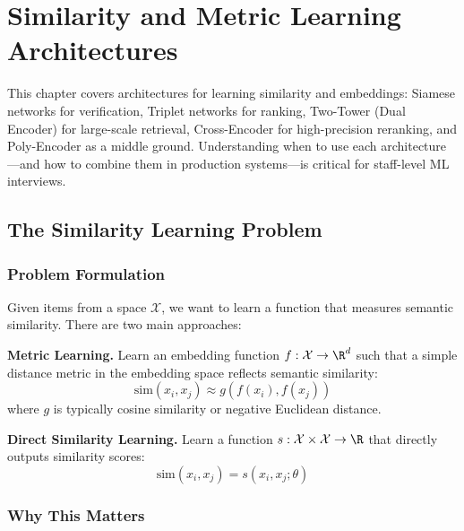 \chapter{Similarity and Metric Learning Architectures}
\label{chap:similarity_architectures}

\begin{tldr}
This chapter covers architectures for learning similarity and embeddings: Siamese networks for verification, Triplet networks for ranking, Two-Tower (Dual Encoder) for large-scale retrieval, Cross-Encoder for high-precision reranking, and Poly-Encoder as a middle ground. Understanding when to use each architecture—and how to combine them in production systems—is critical for staff-level ML interviews.
\end{tldr}

\section{The Similarity Learning Problem}
\label{sec:similarity_problem}

\subsection{Problem Formulation}

Given items from a space $\mathcal{X}$, we want to learn a function that measures semantic similarity. There are two main approaches:

\textbf{Metric Learning.} Learn an embedding function $f: \mathcal{X} \to \R^d$ such that a simple distance metric in the embedding space reflects semantic similarity:
\begin{equation}
\text{sim}(x_i, x_j) \approx g(f(x_i), f(x_j))
\end{equation}
where $g$ is typically cosine similarity or negative Euclidean distance.

\textbf{Direct Similarity Learning.} Learn a function $s: \mathcal{X} \times \mathcal{X} \to \R$ that directly outputs similarity scores:
\begin{equation}
\text{sim}(x_i, x_j) = s(x_i, x_j; \theta)
\end{equation}

\subsection{Why This Matters}

